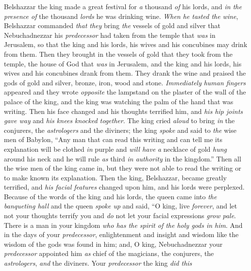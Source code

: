 \begin{biblechapter} %
 Belshazzar the king made a great festival for \textit{a} thousand \textit{of} his lords, and \textit{in the presence of} the thousand \textit{lords} he was drinking wine.
\verse \textit{When he tasted the wine}, Belshazzar commanded \textit{that they} bring \textit{the} vessels of gold and silver that Nebuchadnezzar his \textit{predecessor} had taken from the temple that \textit{was} in Jerusalem, so that the king and his lords, his wives and his concubines may drink from them.
\verse Then they brought in the vessels of gold that they took from the temple, the house of God that \textit{was} in Jerusalem, and the king and his lords, his wives and his concubines drank from them.
\verse They drank the wine and praised the gods of gold and silver, bronze, iron, wood and stone.
\verse \textit{Immediately} \textit{human fingers} appeared and they wrote \textit{opposite} the lampstand on the plaster of the wall of the palace of the king, and the king was watching the palm of the hand that was writing.
\verse Then his face changed and his thoughts terrified him, and \textit{his hip joints gave way} and \textit{his knees knocked together}.
\verse The king cried \textit{aloud} to bring \textit{in} the conjurers, the \textit{astrologers} and the diviners; the king \textit{spoke} and said to \textit{the} wise men of Babylon, “Any man that can read this writing and can tell me its explanation will be clothed \textit{in} purple and \textit{will have} \textit{a} necklace of gold \textit{hung} around his neck and he will rule \textit{as} third \textit{in authority} in the kingdom.”
\verse Then all the wise men of the king came in, but they were not able to read the writing or to make known its explanation.
\verse Then the king, Belshazzar, became greatly terrified, and \textit{his facial features} changed upon him, and his lords were perplexed.
\verse Because of the words of the king and his lords, the queen came into \textit{the banqueting hall} and the queen \textit{spoke up} and said, “O king, live \textit{forever}, and let not your thoughts terrify you and \textit{do} not let your facial expressions \textit{grow pale}.
\verse There is a man in your kingdom \textit{who has the spirit of the holy gods in him}. And in the days of your \textit{predecessor}, enlightenment and insight and wisdom like the wisdom of the gods was found in him; and, O king, Nebuchadnezzar your \textit{predecessor} appointed him \textit{as} chief of the magicians, the conjurers, the \textit{astrologers}, \textit{and} the diviners. Your \textit{predecessor} the king \textit{did this}

\end{biblechapter}
